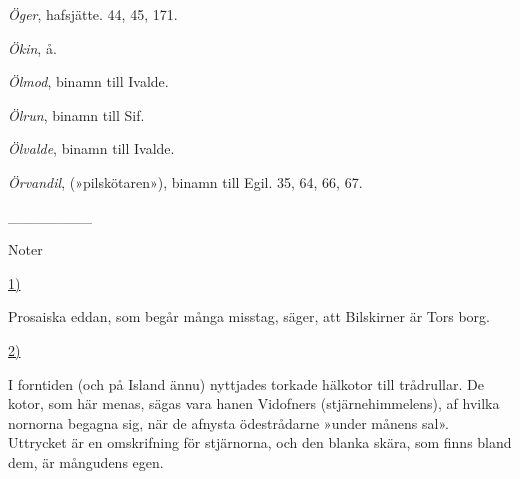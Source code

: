 \emph{Öger}, hafsjätte. 44, 45, 171.

\emph{Ökin}, å.

\emph{Ölmod}, binamn till Ivalde.

\emph{Ölrun}, binamn till Sif.

\emph{Ölvalde}, binamn till Ivalde.

\emph{Örvandil}, (»pilskötaren»), binamn till Egil. 35, 64, 66, 67.

{\_\_\_\_\_\_\_\_}

\hypertarget{lb1625905.xhtmlux5cux23notes}{}
\protect\hypertarget{lb1625905.xhtmlux5cux23noter}{}{} Noter

\protect\hyperlink{lb1625905.xhtmlux5cux23ptrn1}{1)}

Prosaiska eddan, som begår många misstag, säger, att Bilskirner är Tors
borg.

\protect\hyperlink{lb1625905.xhtmlux5cux23ptrn2}{2)}

I forntiden (och på Island ännu) nyttjades torkade hälkotor till
trådrullar. De kotor, som här menas, sägas vara hanen Vidofners
(stjärnehimmelens), af hvilka nornorna begagna sig, när de afnysta
ödestrådarne »under månens sal». Uttrycket är en omskrifning för
stjärnorna, och den blanka skära, som finns bland dem, är mångudens
egen.
